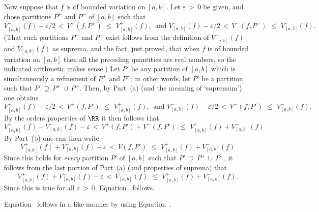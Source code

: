        Now suppose that $f$ is of bounded variation on $[a,b]$.
    Let ${\varepsilon}\,>\,0$ be given, and chose partitions $P^{+}$ and $P^{-}$ of $[a,b]$ such that
        \begin{displaymath}
V^{+}_{[a,b]}(f)-{\varepsilon}/2\,<\,V^{+}(f,P^{+})\,\,{\leq}\,\,V^{+}_{[a,b]}(f),
    \, \mbox{ and }
V^{-}_{[a,b]}(f)-{\varepsilon}/2\,<\,V^{-}(f,P^{-})\,\,{\leq}\,\,V^{-}_{[a,b]}(f).
        \end{displaymath}
    (That such partitions $P^{+}$ and $P^{-}$ exist follows from the definition of $V^{+}_{[a,b]}(f)$ and $V^{-}_{[a,b]}(f)$
    as suprema, and the fact, just proved, that when $f$ is of bounded variation on $[a,b]$ then all the preceding quantities are real numbers,
    so the indicated arithmetic makes sense.)
    Let $P'$ be any partition of $[a,b]$ which is simultaneously a refinement of $P^{+}$ and $P^{-}$;
    in other words, let $P'$ be a partition such that $P' \,{\supseteq}\, P^{+}\,{\cup}\,P^{-}$.
    Then, by Part~(a) (and the meaning of `supremum') one obtains
        \begin{displaymath}
V^{+}_{[a,b]}(f)-{\varepsilon}/2\,<\,V^{+}(f,P')\,\,{\leq}\,\,V^{+}_{[a,b]}(f),
    \, \mbox{ and }
V^{-}_{[a,b]}(f)-{\varepsilon}/2\,<\,V^{-}(f,P')\,\,{\leq}\,\,V^{-}_{[a,b]}(f).
        \end{displaymath}
    By the orders properties of ${\RR}$ it then follows that
        \begin{displaymath}
        V^{+}_{[a,b]}(f) + V^{-}_{[a,b]}(f) -{\varepsilon}\,<\,V^{+}(f,P')+V^{-}(f,P')\,\,{\leq}\,\,V^{+}_{[a,b]}(f) + V^{-}_{[a,b]}(f)
        \end{displaymath}
    By Part~(b) one can then write
        \begin{displaymath}
        V^{+}_{[a,b]}(f) + V^{-}_{[a,b]}(f) -{\varepsilon}\,<\,V(f,P')\,\,{\leq}\,\,V^{+}_{[a,b]}(f) + V^{-}_{[a,b]}(f)
        \end{displaymath}
    Since this holds for {\em every} partition $P'$ of $[a,b]$ such that $P' \,{\supseteq}\, P^{+}\,{\cup}\,P^{-}$,
    it follows from the last portion of Part~(a) (and properties of suprema) that
        \begin{displaymath}
        V^{+}_{[a,b]}(f) + V^{-}_{[a,b]}(f) -{\varepsilon}\,<\,V_{[a,b]}(f)\,\,{\leq}\,\,V^{+}_{[a,b]}(f) + V^{-}_{[a,b]}(f).
        \end{displaymath}
    Since this is true for all ${\varepsilon}\,>\,0$, Equation~ follows.

        Equation~ follows in a like manner by using Equation~.

